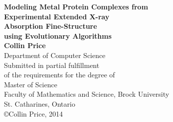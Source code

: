 \begin{titlepage}
\begin{center}

{\LARGE {\bf Modeling Metal Protein Complexes from}}
\\[0.2cm]{\LARGE {\bf Experimental Extended X-ray }}
\\[0.2cm]{\LARGE {\bf Absorption Fine-Structure}}
\\[0.2cm]{\LARGE {\bf using Evolutionary Algorithms}}
\\[3cm]
{\Large{ \bf Collin Price}}
\\[0.5cm]
{\large Department of Computer Science}
\\[3cm]
{\large Submitted in partial fulfillment\\
of the requirements for the degree of}
\\[1cm]
{\large Master of Science}
\\[1cm]
{\large Faculty of Mathematics and Science, Brock University\\
St. Catharines, Ontario}
\\[4cm]
\copyright Collin Price, 2014

\end{center}
\end{titlepage}

